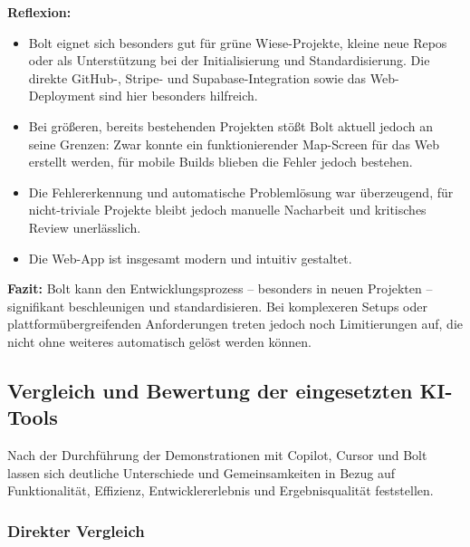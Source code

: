 \textbf{Reflexion:}
\begin{itemize}
    \item Bolt eignet sich besonders gut für grüne Wiese-Projekte, kleine neue Repos oder
          als Unterstützung bei der Initialisierung und Standardisierung. Die direkte
          GitHub-, Stripe- und Supabase-Integration sowie das Web-Deployment sind hier
          besonders hilfreich.
    \item Bei größeren, bereits bestehenden Projekten stößt Bolt aktuell jedoch an seine
          Grenzen: Zwar konnte ein funktionierender Map-Screen für das Web erstellt
          werden, für mobile Builds blieben die Fehler jedoch bestehen.
    \item Die Fehlererkennung und automatische Problemlösung war überzeugend, für
          nicht-triviale Projekte bleibt jedoch manuelle Nacharbeit und kritisches Review
          unerlässlich.
    \item Die Web-App ist insgesamt modern und intuitiv gestaltet.
\end{itemize}

\textbf{Fazit:}
Bolt kann den Entwicklungsprozess – besonders in neuen Projekten – signifikant beschleunigen und standardisieren. Bei komplexeren Setups oder plattformübergreifenden Anforderungen treten jedoch noch Limitierungen auf, die nicht ohne weiteres automatisch gelöst werden können.

\subsection{Vergleich und Bewertung der eingesetzten KI-Tools}

Nach der Durchführung der Demonstrationen mit Copilot, Cursor und Bolt lassen
sich deutliche Unterschiede und Gemeinsamkeiten in Bezug auf Funktionalität,
Effizienz, Entwicklererlebnis und Ergebnisqualität feststellen.

\subsubsection{Direkter Vergleich}


